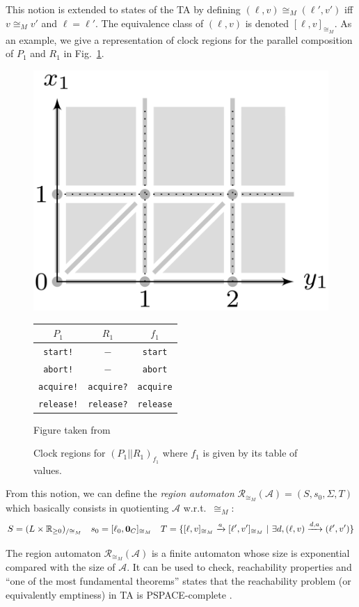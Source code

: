 \documentclass[11pt]{article}
\theoremstyle{definition}
\theoremstyle{remark}
\theoremstyle{definition}
\newtheorem{proposition}{Proposition}
\begin{document}
This notion is extended to states of the TA by defining $(\ell, v) \cong_M (\ell', v')$ iff $v \cong_M v'$ and $\ell = \ell'$. The equivalence class of $(\ell, v)$ is denoted $[\ell, v]_{\cong_M}$.
As an example, we give a representation of clock regions for the parallel composition of $P_1$ and $R_1$ in Fig.~\ref{fig:ta_reg}.

\begin{figure}[ht]
	\centering
	\includegraphics[width=.25\textwidth]{../img/TAreg.png}
	\qquad
	\begin{tabular}[b]{c|c||c}\hline
	$P_1$ & $R_1$ & $f_1$\\
	\hline
	\hline
	\texttt{start!} & $-$ & \texttt{start} \\ \hline
	\texttt{abort!} & $-$ & \texttt{abort} \\ \hline
	\texttt{acquire!} & \texttt{acquire?} & \texttt{acquire} \\ \hline
	\texttt{release!} & \texttt{release?} & \texttt{release} \\ \hline
	\end{tabular}
	\caption{Clock regions for $(P_1 || R_1)_{f_1}$ where $f_1$ is given by its table of values.}\label{fig:ta_reg}
	{\tiny Figure taken from \cite[Chapter 29.3]{handbook}}
\end{figure}

From this notion, we can define the \emph{region automaton} $\mathcal{R}_{\cong_M}(\mathcal{A}) = (S, s_0, \Sigma, T)$ which basically consists in quotienting $\mathcal{A}$ w.r.t.\ $\cong_M$:
$$
S = (L \times \mathbb{R}_{\geq 0})_{/\cong_M} \quad
s_0 = [\ell_0, \text{\bf 0}_C]_{\cong_M} \quad
T = \{ [\ell, v]_{\cong_M} \xrightarrow{a} [\ell', v']_{\cong_M}\ | \ \exists d, (\ell, v) \xrightarrow{d, a} (\ell', v')\}
$$


The region automaton $\mathcal{R}_{\cong_M}(\mathcal{A})$ is a finite automaton whose size is exponential compared with the size of $\mathcal{A}$. It can be used to check, reachability properties and ``one of the most fundamental theorems'' \cite[Chapter 29.2, Theorem 1]{handbook} states that the reachability problem (or equivalently emptiness) in TA is PSPACE-complete \cite[Section~4.5]{AlurDill}.
\end{document}
